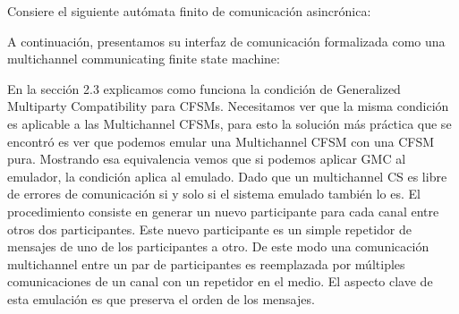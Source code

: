 \begin{example}
Consiere el siguiente autómata finito de comunicación asincrónica:
\begin{center}
        \end{center}
A continuación, presentamos su interfaz de comunicación formalizada como una multichannel communicating finite state machine:
\begin{center}
\end{center}
\end{example}


En la sección 2.3 explicamos como funciona la condición de Generalized Multiparty Compatibility para CFSMs. Necesitamos ver que la misma condición es aplicable a las Multichannel CFSMs, para esto la solución más práctica que se encontró es ver que podemos emular una Multichannel CFSM con una CFSM pura. Mostrando esa equivalencia vemos que si podemos aplicar GMC al emulador, la condición aplica al emulado. Dado que un multichannel CS es libre de errores de comunicación si y solo si el sistema emulado también lo es. El procedimiento consiste en generar un nuevo participante para cada canal entre otros dos participantes. Este nuevo participante es un simple repetidor de mensajes de uno de los participantes a otro. De este modo una comunicación multichannel entre un par de participantes es reemplazada por múltiples comunicaciones de un canal con un repetidor en el medio. El aspecto clave de esta emulación es que preserva el orden de los mensajes.

